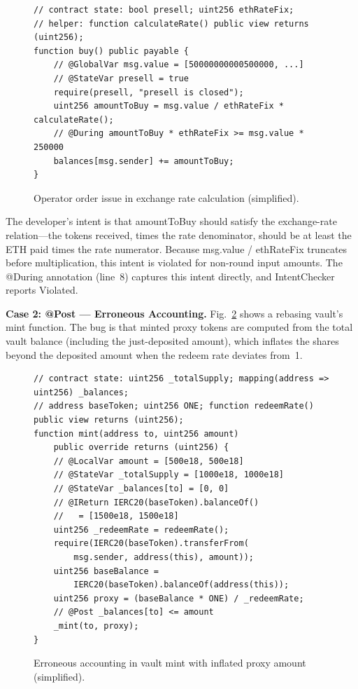 \documentclass[pdflatex,sn-basic]{sn-jnl}%
\theoremstyle{thmstyleone}%
\theoremstyle{thmstyletwo}%
\theoremstyle{thmstylethree}%
\begin{document}
\begin{figure}[t]
\begin{lstlisting}
// contract state: bool presell; uint256 ethRateFix;
// helper: function calculateRate() public view returns (uint256);
function buy() public payable {
    // @GlobalVar msg.value = [50000000000500000, ...]
    // @StateVar presell = true
    require(presell, "presell is closed");
    uint256 amountToBuy = msg.value / ethRateFix * calculateRate();
    // @During amountToBuy * ethRateFix >= msg.value * 250000
    balances[msg.sender] += amountToBuy;
}
\end{lstlisting}
\caption{Operator order issue in exchange rate calculation (simplified).}
\label{fig:operator-order-example}
\end{figure}

The developer's intent is that amountToBuy should satisfy the exchange-rate relation---the tokens received, times the rate denominator, should be at least the ETH paid times the rate numerator.
Because msg.value / ethRateFix truncates before multiplication, this intent is violated for non-round input amounts.
The @During annotation (line~8) captures this intent directly, and IntentChecker reports Violated.

\smallskip
\noindent\textbf{Case 2: @Post --- Erroneous Accounting.}
Fig.~\ref{fig:erroneous-accounting-example} shows a rebasing vault's mint function.
The bug is that minted proxy tokens are computed from the total vault balance (including the just-deposited amount), which inflates the shares beyond the deposited amount when the redeem rate deviates from~1.

\begin{figure}[t]
\begin{lstlisting}
// contract state: uint256 _totalSupply; mapping(address => uint256) _balances;
// address baseToken; uint256 ONE; function redeemRate() public view returns (uint256);
function mint(address to, uint256 amount)
    public override returns (uint256) {
    // @LocalVar amount = [500e18, 500e18]
    // @StateVar _totalSupply = [1000e18, 1000e18]
    // @StateVar _balances[to] = [0, 0]
    // @IReturn IERC20(baseToken).balanceOf()
    //   = [1500e18, 1500e18]
    uint256 _redeemRate = redeemRate();
    require(IERC20(baseToken).transferFrom(
        msg.sender, address(this), amount));
    uint256 baseBalance =
        IERC20(baseToken).balanceOf(address(this));
    uint256 proxy = (baseBalance * ONE) / _redeemRate;
    // @Post _balances[to] <= amount
    _mint(to, proxy);
}
\end{lstlisting}
\caption{Erroneous accounting in vault mint with inflated proxy amount (simplified).}
\label{fig:erroneous-accounting-example}
\end{figure}
\end{document}
